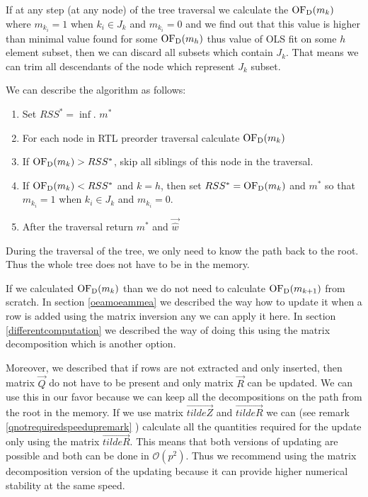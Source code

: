 If at any step (at any node) of the tree traversal we calculate the
$\operatorname{OF_D}(m_k)$ where $m_{k_i} = 1$ when $k_i \in J_k$ and $m_{k_i} = 0$ and we find out that this value is higher than minimal value found for some $\operatorname{OF_D}(m_h)$ thus value of OLS fit on some $h$ element subset, then we can discard all subsets which contain $J_k$. That means we can trim all descendants of the node which represent $J_k$ subset.

We can describe the algorithm as follows:

\begin{enumerate}
    \item Set $RSS^* = \inf$. $m^*$
    \item For each node in RTL preorder traversal calculate $\operatorname{OF_D}(m_k)$
    \item If $\operatorname{OF_D}(m_k) > RSS^*$, skip all siblings of this node in the traversal.
    \item If $\operatorname{OF_D}(m_k) < RSS^* $ and $k = h$, then set $RSS^* = \operatorname{OF_D}(m_k)$ and $m^*$ so that $m_{k_i} = 1$ when $k_i \in J_k$ and $m_{k_i} = 0$.
 \item After the traversal return $m^*$ and $\vec{\hat{w}}$
\end{enumerate}

During the traversal of the tree, we only need to know the path back to the root. Thus the whole tree does not have to be in the memory. 

\begin{remark}
If we calculated $\operatorname{OF_D}(m_{k})$ than we do not need to calculate $\operatorname{OF_D}(m_{k+1})$ from scratch. In section \ref{oeamoeammea} we described the way how to update it when a row is added using the matrix inversion any we can apply it here. In section \ref{differentcomputation} we described the way of doing this using the matrix decomposition which is another option. 

Moreover, we described that if rows are not extracted and only inserted, then matrix $\vec{Q}$ do not have to be present and only matrix $\vec{R}$ can be updated. We can use this in our favor because we can keep all the decompositions on the path from the root in the memory.  If we use matrix $\vec{tilde{Z}}$ and $\vec{tilde{R}}$ we can  (see remark \ref{qnotrequiredspeedupremark} ) calculate all the quantities required for the update only using the matrix $\vec{tilde{R}}$. This means that both versions of updating are possible and both can be done in $\mathcal{O}(p^2)$. Thus we recommend using the matrix decomposition version of the updating because it can provide higher numerical stability at the same speed.
\end{remark}

